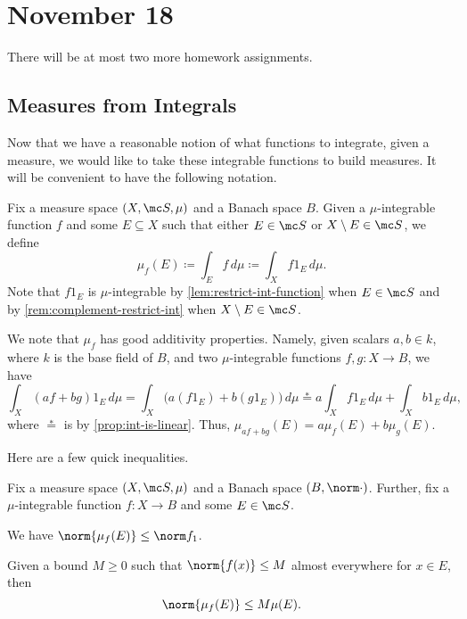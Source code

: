 \documentclass[../notes.tex]{subfiles}
\begin{document}
\section{November 18}

There will be at most two more homework assignments.

\subsection{Measures from Integrals}
Now that we have a reasonable notion of what functions to integrate, given a measure, we would like to take these integrable functions to build measures. It will be convenient to have the following notation.
\begin{notation}
	Fix a measure space $(X,\mc S,\mu)$ and a Banach space $B$. Given a $\mu$-integrable function $f$ and some $E\subseteq X$ such that either $E\in\mc S$ or $X\setminus E\in\mc S$, we define
	\[\mu_f(E)\coloneqq\int_Ef\,d\mu\coloneqq\int_Xf1_E\,d\mu.\]
	Note that $f1_E$ is $\mu$-integrable by \autoref{lem:restrict-int-function} when $E\in\mc S$ and by \autoref{rem:complement-restrict-int} when $X\setminus E\in\mc S$.
\end{notation}
\begin{remark} \label{rem:linear-combo-mu-f}
	We note that $\mu_f$ has good additivity properties. Namely, given scalars $a,b\in k$, where $k$ is the base field of $B$, and two $\mu$-integrable functions $f,g\colon X\to B$, we have
	\[\int_X(af+bg)1_E\,d\mu=\int_X\big(a(f1_E)+b(g1_E)\big)\,d\mu\stackrel*=a\int_Xf1_E\,d\mu+\int_Xb1_E\,d\mu,\]
	where $\stackrel*=$ is by \autoref{prop:int-is-linear}. Thus, $\mu_{af+bg}(E)=a\mu_f(E)+b\mu_g(E)$.
\end{remark}
Here are a few quick inequalities.
\begin{lemma} \label{lem:bound-mu-f}
	Fix a measure space $(X,\mc S,\mu)$ and a Banach space $(B,\norm\cdot)$. Further, fix a $\mu$-integrable function $f\colon X\to B$ and some $E\in\mc S$.
	\begin{listalph}
		\item We have $\norm{\mu_f(E)}\le\norm f_1$.
		\item Given a bound $M\ge0$ such that $\norm{f(x)}\le M$ almost everywhere for $x\in E$, then
		\[\norm{\mu_f(E)}\le M\mu(E).\]
	\end{listalph}
\end{lemma}
\end{document}
